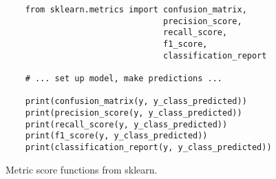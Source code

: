 \begin{figure}
\begin{code}
  \begin{verbatim}
    from sklearn.metrics import confusion_matrix, 
                                precision_score, 
                                recall_score, 
                                f1_score, 
                                classification_report

    # ... set up model, make predictions ...

    print(confusion_matrix(y, y_class_predicted))
    print(precision_score(y, y_class_predicted))
    print(recall_score(y, y_class_predicted))
    print(f1_score(y, y_class_predicted))
    print(classification_report(y, y_class_predicted))
  \end{verbatim}
  \caption{Metric score functions from sklearn.}
  \label{code:sklearn_metrics}
\end{code}
\end{figure}